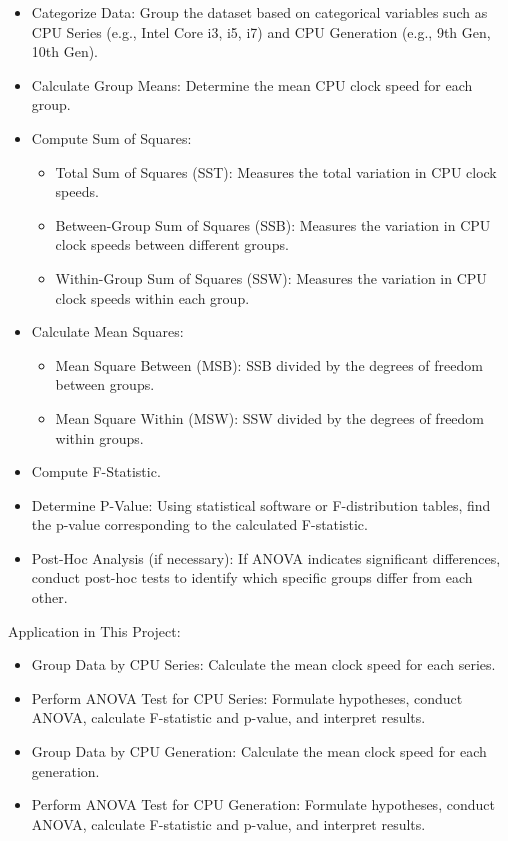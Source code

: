 \begin{itemize}
    \item Categorize Data: Group the dataset based on categorical variables such as CPU Series (e.g., Intel Core i3, i5, i7) and CPU Generation (e.g., 9th Gen, 10th Gen).
    
    \item Calculate Group Means: Determine the mean CPU clock speed for each group.
    
    \item Compute Sum of Squares:
    \begin{itemize}
        \item Total Sum of Squares (SST): Measures the total variation in CPU clock speeds.
        \item Between-Group Sum of Squares (SSB): Measures the variation in CPU clock speeds between different groups.
        \item Within-Group Sum of Squares (SSW): Measures the variation in CPU clock speeds within each group.
    \end{itemize}

    \item Calculate Mean Squares:
    \begin{itemize}
        \item Mean Square Between (MSB): SSB divided by the degrees of freedom between groups.
        \item Mean Square Within (MSW): SSW divided by the degrees of freedom within groups.
    \end{itemize}

    \item Compute F-Statistic.
     
    \item Determine P-Value: Using statistical software or F-distribution tables, find the p-value corresponding to the calculated F-statistic.
    
    \item Post-Hoc Analysis (if necessary): If ANOVA indicates significant differences, conduct post-hoc tests to identify which specific groups differ from each other.
\end{itemize}

Application in This Project:

\begin{itemize}
    \item Group Data by CPU Series: Calculate the mean clock speed for each series.
    \item Perform ANOVA Test for CPU Series: Formulate hypotheses, conduct ANOVA, calculate F-statistic and p-value, and interpret results.
    \item Group Data by CPU Generation: Calculate the mean clock speed for each generation.
    \item Perform ANOVA Test for CPU Generation: Formulate hypotheses, conduct ANOVA, calculate F-statistic and p-value, and interpret results.
\end{itemize}

